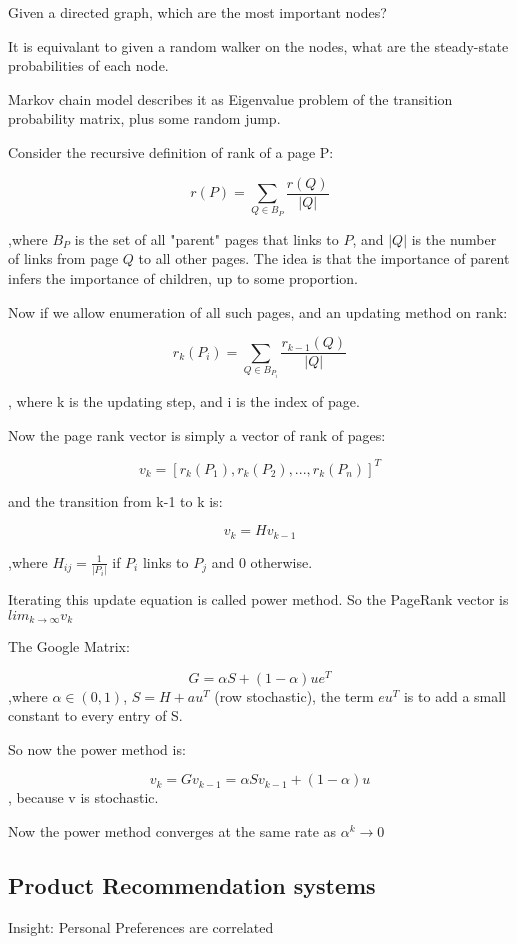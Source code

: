 \documentclass{article}
\begin{document}
Given a directed graph, which are the most important nodes?

It is equivalant to given a random walker on the nodes, what are the 
steady-state probabilities of each node.

Markov chain model describes it as Eigenvalue problem of the transition
probability matrix, plus some random jump.


Consider the recursive definition of rank of a page P:

$$
r(P) = \sum_{Q\in B_P} \frac{r(Q)}{|Q|}
$$

,where $B_P$ is the set of all "parent" pages that links to $P$,
and $|Q|$ is the number of links from page $Q$ to all other pages. The idea 
is that the importance of parent infers the importance of children, up 
to some proportion.

Now if we allow enumeration of all such pages, and an updating method on rank:

$$
r_k (P_i) =  \sum_{Q\in B_{P_i}} \frac{r_{k-1}(Q)}{|Q|}
$$

, where k is the updating step, and i is the index of page.

Now the page rank vector is simply a vector of rank of pages:

$$
v_k = [r_k(P_1),r_k(P_2),...,r_k(P_n)]^T
$$

and the transition from k-1 to k is:

$$
v_k = Hv_{k-1}
$$

,where $H_{ij}=\frac{1}{|P_i|}$ if $P_i$ links to $P_j$ and 0 otherwise.

Iterating this update equation is called power method. So the PageRank
vector is $lim_{k\to\infty}v_k$

The Google Matrix:

$$
G = \alpha S+ (1-\alpha)ue^T
$$
,where $\alpha\in (0,1)$, $S=H+au^T$ (row stochastic),
the term $eu^T$ is to add a small constant to every entry of S.

So now the power method is:

$$
v_k= Gv_{k-1}= \alpha S v_{k-1} + (1-\alpha)u
$$
, because v is stochastic.

Now the power method converges at the same rate as $\alpha^k \to 0$

\subsection{Product Recommendation systems}

Insight: Personal Preferences are correlated
\end{document}
